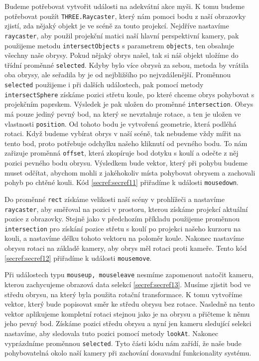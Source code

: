 \documentclass[czech,bachelor,dept420,male,cpdeclaration]{diploma}
\begin{document}
Budeme potřebovat vytvořit události na adekvátní akce myši. K tomu budeme potřebovat použít \texttt{THREE.Raycaster}, který nám pomoci bodu z naší obrazovky zjistí, zda nějaký objekt je ve scéně za touto projekcí. Nejdříve nastavíme \texttt{raycaster}, aby použil projekční matici naší hlavní perspektivní kamery, pak použijeme metodu \texttt{intersectObjects} s parametrem \texttt{objects}, ten obsahuje všechny naše obrysy. Pokud nějaký obrys našel, tak si náš objekt uložíme do třídní proměnné \texttt{selected}. Kdyby bylo více obrysů za sebou, metoda by vrátila oba obrysy, ale seřadila by je od nejbližšího po nejvzdálenější. Proměnnou \texttt{selected} použijeme i při dalších událostech, pak pomocí metody \texttt{intersectSphere} získáme pozici střetu koule, po které chceme obrys pohybovat s projekčním paprskem. Výsledek je pak uložen do proměnné \texttt{intersection}. Obrys má pouze jediný pevný bod, na který se nevztahuje rotace, a ten je uložen ve vlastnosti \texttt{position}. Od tohoto bodu je vytvořená geometrie, která podléhá rotaci. Když budeme vybírat obrys v naší scéně, tak nebudeme vždy mířit na tento bod, proto potřebuje odchylku našeho kliknutí od pevného bodu. To nám zařizuje proměnná \texttt{offset}, která zkopíruje bod dotyku s koulí a odečte z něj pozici pevného bodu obrysu. Výsledkem bude vektor, který při pohybu budeme muset odčítat, abychom mohli z jakéhokoliv místa pohybovat obrysem a zachovali pohyb po chtěné kouli. Kód \ref{secref:secref11} přiřadíme k události \texttt{mousedown}.



Do proměnné \texttt{rect} získáme velikosti naší scény v prohlížeči a nastavíme \texttt{raycaster}, aby směřoval na pozici v prostoru, kterou získáme projekcí aktuální pozice z obrazovky. Stejně jako v předchozím příkladu použijeme proměnnou \texttt{intersection} pro získání pozice střetu s koulí po projekci našeho kurzoru na kouli, a nastavíme délku tohoto vektoru na poloměr koule. Nakonec nastavíme obrysu rotaci na základě kamery, aby obrys měl rotaci proti kameře. Tento kód \ref{secref:secref12} přiřadíme k události \texttt{mousemove}.    



Při událostech typu \texttt{mouseup, mouseleave} nesmíme zapomenout natočit kameru, kterou zachycujeme obrazová data selekcí \ref{secref:secref13}. Musíme zjistit bod ve středu obrysu, na který byla použita rotační transformace. K tomu vytvoříme vektor, který bude popisovat směr ke středu obrysu bez rotace. Nasledně na tento vektor aplikujeme kompletní rotaci stejnou jako je na obrysu a přičteme k němu jeho pevný bod. Získáme pozici středu obrysu a nyní jen kameru sledující selekci nastavíme, aby sledovala tuto pozici pomocí metody \texttt{lookAt}. Nakonec vyprázdníme proměnnou \texttt{selected}. Tyto části kódu nám zařídí, že naše bude pohybovatelná okolo naší kamery při zachování dosavadní funkcionality systému.
\end{document}
